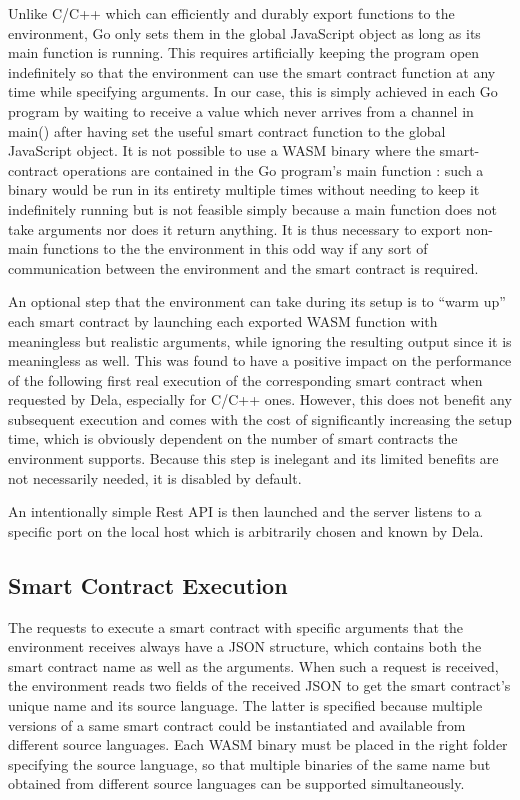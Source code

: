 \documentclass[11pt, a4paper, twoside, openright]{article}
\begin{document}
Unlike C/C++ which can efficiently and durably export functions to the environment, Go only sets them in the global JavaScript object as long as its main function is running. This requires artificially keeping the program open indefinitely so that the environment can use the smart contract function at any time while specifying arguments. In our case, this is simply achieved in each Go program by waiting to receive a value which never arrives from a channel in main() after having set the useful smart contract function to the global JavaScript object. It is not possible to use a WASM binary where the smart-contract operations are contained in the Go program's main function : such a binary would be run in its entirety multiple times without needing to keep it indefinitely running but is not feasible simply because a main function does not take arguments nor does it return anything. It is thus necessary to export non-main functions to the the environment in this odd way if any sort of communication between the environment and the smart contract is required.

An optional step that the environment can take during its setup is to ``warm up'' each smart contract by launching each exported WASM function with meaningless but realistic arguments, while ignoring the resulting output since it is meaningless as well. This was found to have a positive impact on the performance of the following first real execution of the corresponding smart contract when requested by Dela, especially for C/C++ ones. However, this does not benefit any subsequent execution and comes with the cost of significantly increasing the setup time, which is obviously dependent on the number of smart contracts the environment supports. Because this step is inelegant and its limited benefits are not necessarily needed, it is disabled by default.

An intentionally simple Rest API is then launched and the server listens to a specific port on the local host which is arbitrarily chosen and known by Dela.
 
\subsection{Smart Contract Execution}

The requests to execute a smart contract with specific arguments that the environment receives always have a JSON structure, which contains both the smart contract name as well as the arguments. When such a request is received, the environment reads two fields of the received JSON to get the smart contract's unique name and its source language. The latter is specified because multiple versions of a same smart contract could be instantiated and available from different source languages. Each WASM binary must be placed in the right folder specifying the source language, so that multiple binaries of the same name but obtained from different source languages can be supported simultaneously. 
\end{document}
